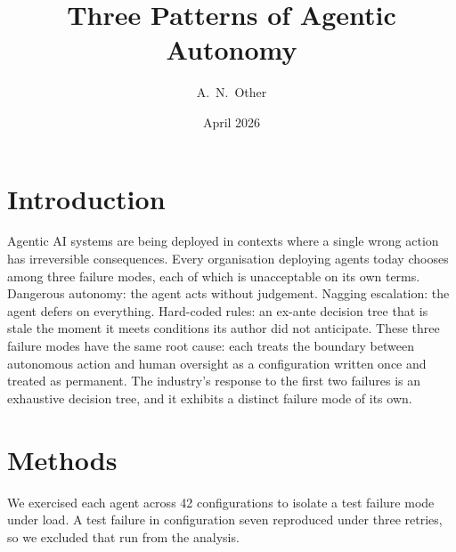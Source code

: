 \documentclass[11pt]{article}
\title{Three Patterns of Agentic Autonomy}
\author{A.\ N.\ Other}
\date{April 2026}
\begin{document}
\maketitle

\section{Introduction}

Agentic AI systems are being deployed in contexts where a single wrong action has irreversible consequences.
Every organisation deploying agents today chooses among three failure modes, each of which is unacceptable on its own terms.
Dangerous autonomy: the agent acts without judgement. Nagging escalation: the agent defers on everything. Hard-coded rules: an ex-ante decision tree that is stale the moment it meets conditions its author did not anticipate.
These three failure modes have the same root cause: each treats the boundary between autonomous action and human oversight as a configuration written once and treated as permanent.
The industry's response to the first two failures is an exhaustive decision tree, and it exhibits a distinct failure mode of its own.

\section{Methods}

We exercised each agent across 42 configurations to isolate a test failure mode under load.
A test failure in configuration seven reproduced under three retries, so we excluded that run from the analysis.
\end{document}
